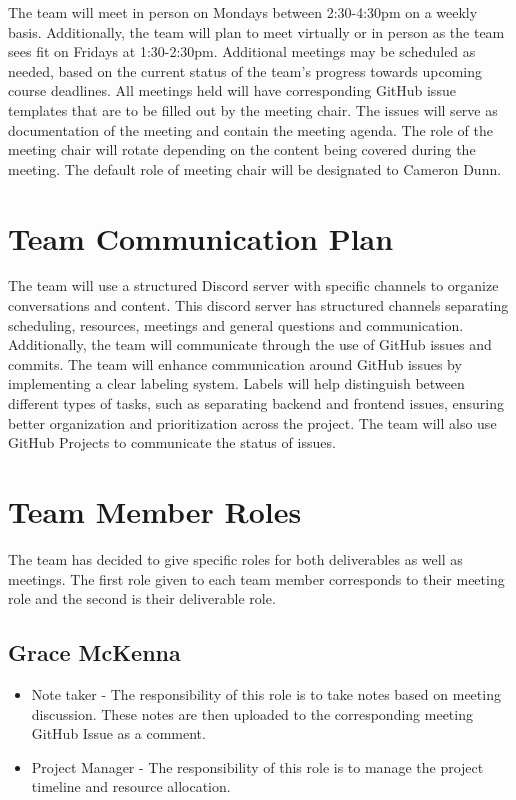 \documentclass{article}
\begin{document}
The team will meet in person on Mondays between 2:30-4:30pm on a weekly basis. 
Additionally, the team will plan to meet virtually or in person as the team sees fit on Fridays at 1:30-2:30pm.
Additional meetings may be scheduled as needed, based on the current status of the team's progress towards upcoming course deadlines. 
All meetings held will have corresponding GitHub issue templates that are to be filled out by the meeting chair. The issues will serve as documentation of the meeting and contain the meeting agenda.
The role of the meeting chair will rotate depending on the content being covered during the meeting. 
The default role of meeting chair will be designated to Cameron Dunn. 

\section{Team Communication Plan}

The team will use a structured Discord server with specific channels to organize conversations and content. 
This discord server has structured channels separating scheduling, resources, meetings and general questions and communication. 
Additionally, the team will communicate through the use of GitHub issues and commits. 
The team will enhance communication around GitHub issues by implementing a clear labeling system. 
Labels will help distinguish between different types of tasks, such as separating backend and frontend issues, ensuring better organization and prioritization across the project. 
The team will also use GitHub Projects to communicate the status of issues. 

\section{Team Member Roles}

The team has decided to give specific roles for both deliverables as well as meetings. 
The first role given to each team member corresponds to their meeting role and the second is their deliverable role.

\subsection*{Grace McKenna}
\begin{itemize}
	\item Note taker - The responsibility of this role is to take notes based on meeting discussion. These notes are then uploaded to the corresponding meeting GitHub Issue as a comment. 
  \item Project Manager - The responsibility of this role is to manage the project timeline and resource allocation. 
\end{itemize}
\end{document}
